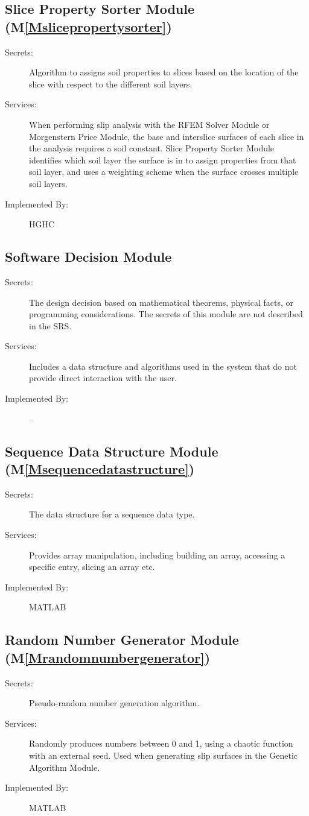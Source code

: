 \documentclass[12pt]{article}
\begin{document}
\subsection{Slice Property Sorter Module (M\ref{Mslicepropertysorter})}
\label{Sec:SPSM()}
\begin{description}
\item[Secrets:]Algorithm to assigns soil properties to slices based on the location of the slice with respect to the different soil layers.
\item[Services:]When performing slip analysis with the RFEM Solver Module or Morgenstern Price Module, the base and interslice surfaces of each slice in the analysis requires a soil constant. Slice Property Sorter Module identifies which soil layer the surface is in to assign properties from that soil layer, and uses a weighting scheme when the surface crosses multiple soil layers.
\item[Implemented By:]HGHC
\end{description}
\subsection{Software Decision Module}
\label{Sec:SDM}
\begin{description}
\item[Secrets:]The design decision based on mathematical theorems, physical facts, or programming considerations. The secrets of this module are not described in the SRS.
\item[Services:]Includes a data structure and algorithms used in the system that do not provide direct interaction with the user.
\item[Implemented By:]--
\end{description}
\subsection{Sequence Data Structure Module (M\ref{Msequencedatastructure})}
\label{Sec:SDSM()}
\begin{description}
\item[Secrets:]The data structure for a sequence data type.
\item[Services:]Provides array manipulation, including building an array, accessing a specific entry, slicing an array etc.
\item[Implemented By:]MATLAB
\end{description}
\subsection{Random Number Generator Module (M\ref{Mrandomnumbergenerator})}
\label{Sec:RNGM()}
\begin{description}
\item[Secrets:]Pseudo-random number generation algorithm.
\item[Services:]Randomly produces numbers between 0 and 1, using a chaotic function with an external seed. Used when generating slip surfaces in the Genetic Algorithm Module.
\item[Implemented By:]MATLAB
\end{description}
\end{document}
